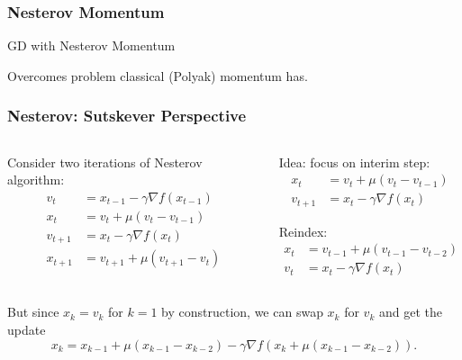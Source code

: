 \documentclass[aspectratio=1610,onlytextwidth]{beamer}
\begin{document}
\begin{frame}[c]
  \frametitle{Nesterov Momentum}
  \begin{algorithm}[H]
    \KwData{$\gamma >0$, $\mu \in [0,1)$}
    \caption{GD with Nesterov Momentum}
  \end{algorithm}

  \bigskip

  Overcomes problem classical (Polyak) momentum has.

\end{frame}

\begin{frame}[c]
  \frametitle{Nesterov: Sutskever Perspective}
  \begin{columns}
    \begin{column}{0.45\textwidth}
      Consider two iterations of Nesterov algorithm:
      \[
        \begin{aligned}
          v_{t}   & = x_{t-1} - \gamma \nabla f\left(x_{t-1} \right) \\
          x_{t}   & = v_{t} + \mu\left(v_{t} - v_{{t-1}} \right)     \\
          v_{t+1} & = x_{t} - \gamma \nabla f\left(x_{t} \right)     \\
          x_{t+1} & = v_{t+1} + \mu\left(v_{t+1} - v_{t} \right)
        \end{aligned}
      \]
    \end{column}

    \pause

    \begin{column}{0.45\textwidth}
      Idea: focus on interim step:
      \[
        \begin{aligned}
          x_{t}   & = v_{t} + \mu\left(v_{t} - v_{{t-1}} \right) \\
          v_{t+1} & = x_{t} - \gamma \nabla f\left(x_{t} \right)
        \end{aligned}
      \]

      \pause

      Reindex:
      \[
        \begin{aligned}
          x_{t} & = v_{t-1} + \mu\left(v_{t-1} - v_{{t-2}} \right) \\
          v_{t} & = x_{t} - \gamma \nabla f\left(x_{t} \right)
        \end{aligned}
      \]
    \end{column}

  \end{columns}

  \pause \bigskip

  But since $x_k = v_k$ for $k=1$ by construction, we can swap $x_k$ for $v_k$ and
  get the update
  \[
    x_k = x_{k-1} + \mu(x_{k-1} - x_{k-2}) - \gamma \nabla f(x_{k} + \mu(x_{k-1} - x_{k-2})).
  \]
\end{frame}
\end{document}
